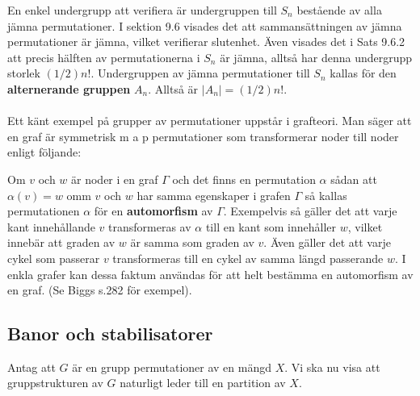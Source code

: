 \documentclass{article}
\begin{document}
En enkel undergrupp att verifiera är undergruppen till $S_n$ bestående av alla jämna permutationer. I sektion 9.6 visades det att sammansättningen av jämna permutationer är jämna, vilket verifierar slutenhet. Även visades det i Sats 9.6.2 att precis hälften av permutationerna i $S_n$ är jämna, alltså har denna undergrupp storlek $(1/2)n!$. Undergruppen av jämna permutationer till $S_n$ kallas för den \textbf{alternerande gruppen} $A_n$. Alltså är $|A_n|=(1/2)n!$.
\\ \\
Ett känt exempel på grupper av permutationer uppstår i grafteori. Man säger att en graf är symmetrisk m a p permutationer som transformerar noder till noder enligt följande: 

Om $v$ och $w$ är noder i en graf $\Gamma$ och det finns en permutation $\alpha$ sådan att $\alpha(v)=w$ omm $v$ och $w$ har samma egenskaper i grafen $\Gamma$ så kallas permutationen $\alpha$ för en \textbf{automorfism} av $\Gamma$. Exempelvis så gäller det att varje kant innehållande $v$ transformeras av $\alpha$ till en kant som innehåller $w$, vilket innebär att graden av $w$ är samma som graden av $v$. Även gäller det att varje cykel som passerar $v$ transformeras till en cykel av samma längd passerande $w$. I enkla grafer kan dessa faktum användas för att helt bestämma en automorfism av en graf. (Se Biggs s.282 för exempel).


\subsection{Banor och stabilisatorer}
Antag att $G$ är en grupp permutationer av en mängd $X$. Vi ska nu visa att gruppstrukturen av $G$ naturligt leder till en partition av $X$. 
\end{document}
